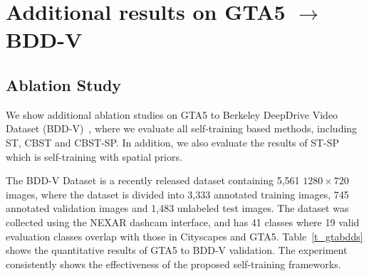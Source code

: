 \documentclass[runningheads]{llncs}
\begin{document}
\section{Additional results on GTA5 $\rightarrow$ BDD-V}
\subsection{Ablation Study} 
We show additional ablation studies on GTA5 to Berkeley DeepDrive Video Dataset (BDD-V)~\cite{nexar}, where we evaluate all self-training based methods, including ST, CBST and CBST-SP. In addition, we also evaluate the results of ST-SP which is self-training with spatial priors.

The BDD-V Dataset is a recently released dataset containing 5,561 $1280 \times 720$ images, where the dataset is divided into 3,333 annotated training images, 745 annotated validation images and 1,483 unlabeled test images. The dataset was collected using the NEXAR dashcam interface, and has 41 classes where 19 valid evaluation classes overlap with those in Cityscapes and GTA5. Table~\ref{t_gtabdds} shows the quantitative results of GTA5 to BDD-V validation. The experiment consistently shows the effectiveness of the proposed self-training frameworks.
\end{document}
